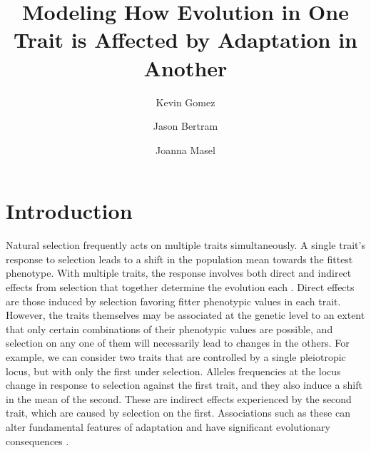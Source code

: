 \documentclass[9pt,twocolumn,twoside]{gsajnl}
\title{Modeling How Evolution in One Trait is Affected by Adaptation in Another}
\author[$\ast$,1]{Kevin Gomez}
\author[$\dagger$]{Jason Bertram}
\author[$\dagger$]{Joanna Masel}
\affil[$\ast$]{Department of Applied Mathematics, University of Arizona, and}
\affil[$\dagger$]{Department of Evolution and Ecology, Univeristy of Arizona}
\begin{document}
\maketitle
\thispagestyle{firststyle}
\marginmark
\firstpagefootnote
{}
\vspace{-11pt}%

\section{Introduction}

Natural selection frequently acts on multiple traits simultaneously. A single trait's response to selection leads to a shift in the population mean towards the fittest phenotype. With multiple traits, the response involves both direct and indirect effects from selection that together determine the evolution each \citep{lande1983measurement,Scarcelli23102007,Lovell2013,Wagner2011}. Direct effects are those induced by selection favoring fitter phenotypic values in each trait.  However, the traits themselves may be associated at the genetic level to an extent that only certain combinations of their phenotypic values are possible, and selection on any one of them will necessarily lead to changes in the others. For example, we can consider two traits that are controlled by a single pleiotropic locus, but with only the first under selection. Alleles frequencies at the locus change in response to selection against the first trait, and they also induce a shift in the mean of the second. These are indirect effects experienced by the second trait, which are caused by selection on the first.  Associations such as these can alter fundamental features of adaptation and have significant evolutionary consequences \citep{Felsenstein1979, Arnold2001, Arnold2008}.\par
% 
% 
% 
% 
\end{document}

